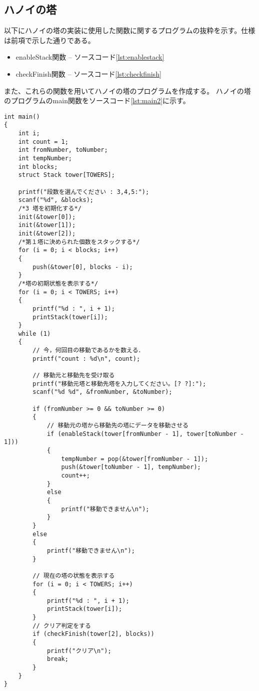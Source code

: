 \documentclass[a4paper,11pt]{jsarticle}
\begin{document}
\subsection{ハノイの塔}
以下にハノイの塔の実装に使用した関数に関するプログラムの抜粋を示す。仕様は前項で示した通りである。
\begin{itemize}
  \item enableStack関数 --  ソースコード\ref{lst:enablestack}
  \item checkFinish関数 --  ソースコード\ref{lst:checkfinish}
\end{itemize}
また、これらの関数を用いてハノイの塔のプログラムを作成する。
ハノイの塔のプログラムのmain関数をソースコード\ref{lst:main2}に示す。
\begin{lstlisting}[caption={main関数}, label={lst:main2}]
int main()
{
    int i;
    int count = 1;
    int fromNumber, toNumber;
    int tempNumber;
    int blocks;
    struct Stack tower[TOWERS];

    printf("段数を選んでください : 3,4,5:");
    scanf("%d", &blocks);
    /*3 塔を初期化する*/
    init(&tower[0]);
    init(&tower[1]);
    init(&tower[2]);
    /*第１塔に決められた個数をスタックする*/
    for (i = 0; i < blocks; i++)
    {
        push(&tower[0], blocks - i);
    }
    /*塔の初期状態を表示する*/
    for (i = 0; i < TOWERS; i++)
    {
        printf("%d : ", i + 1);
        printStack(tower[i]);
    }
    while (1)
    {
        // 今，何回目の移動であるかを数える．
        printf("count : %d\n", count);

        // 移動元と移動先を受け取る
        printf("移動元塔と移動先塔を入力してください。[? ?]:");
        scanf("%d %d", &fromNumber, &toNumber);

        if (fromNumber >= 0 && toNumber >= 0)
        {
            // 移動元の塔から移動先の塔にデータを移動させる
            if (enableStack(tower[fromNumber - 1], tower[toNumber - 1]))
            {
                tempNumber = pop(&tower[fromNumber - 1]);
                push(&tower[toNumber - 1], tempNumber);
                count++;
            }
            else
            {
                printf("移動できません\n");
            }
        }
        else
        {
            printf("移動できません\n");
        }

        // 現在の塔の状態を表示する
        for (i = 0; i < TOWERS; i++)
        {
            printf("%d : ", i + 1);
            printStack(tower[i]);
        }
        // クリア判定をする
        if (checkFinish(tower[2], blocks))
        {
            printf("クリア\n");
            break;
        }
    }
}
\end{lstlisting}
\end{document}
